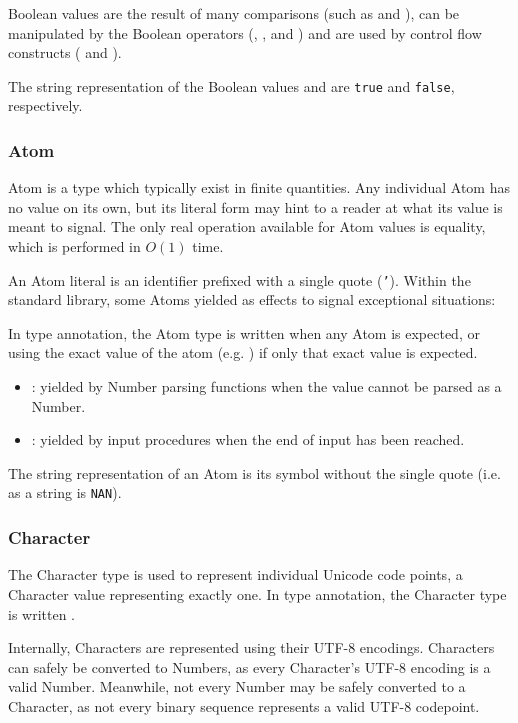 Boolean values are the result of many comparisons (such as  and
), can be manipulated by the Boolean operators (, ,
and ) and are used by control flow constructs ( and
).

The string representation of the Boolean values
 and  are \texttt{true} and \texttt{false},
respectively.

\subsubsection{Atom}

Atom is a type which typically exist in finite quantities. Any individual
Atom has no value on its own, but its literal form may hint to a reader at
what its value is meant to signal. The only real operation available for
Atom values is equality, which is performed in $O(1)$ time.

An Atom literal is an identifier prefixed with a single quote (\texttt{'}).
Within the standard library, some Atoms yielded as effects to signal
exceptional situations:

In type annotation, the Atom type is written  when any Atom
is expected, or using the exact value of the atom (e.g. ) if
only that exact value is expected.

\begin{itemize}
    \item {}: yielded by Number parsing functions when the value
    cannot be parsed as a Number.
    \item {}: yielded by input procedures when the end of input
    has been reached.
\end{itemize}

The string representation of an Atom is its symbol without the single quote
(i.e.  as a string is \texttt{NAN}).

\subsubsection{Character}

The Character type is used to represent individual Unicode code points,
a Character value representing exactly one.
In type annotation, the Character type is written .

Internally, Characters are represented using their UTF-8 encodings. Characters
can safely be converted to Numbers, as every Character's UTF-8 encoding is a valid
Number. Meanwhile, not every Number may be safely converted to a Character,
as not every binary sequence represents a valid UTF-8 codepoint.

